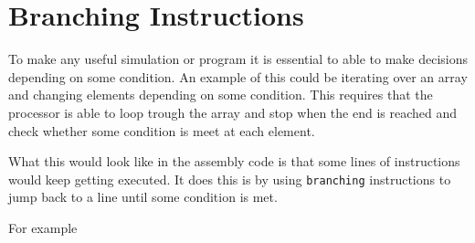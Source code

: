         
    \section{Branching Instructions}
        To make any useful simulation or program it is essential to able to make decisions depending on some condition. An example of this could be iterating over an array and changing elements depending on some condition. This requires that the processor is able to loop trough the array and stop when the end is reached and check whether some condition is meet at each element.
        
        What this would look like in the assembly code is that some lines of instructions would keep getting executed. It does this is by using \texttt{branching} instructions to jump back to a line until some condition is met.
        
        For example 
        
        \begin{lstlisting}[language=C]

        
        \end{lstlisting}
        
    